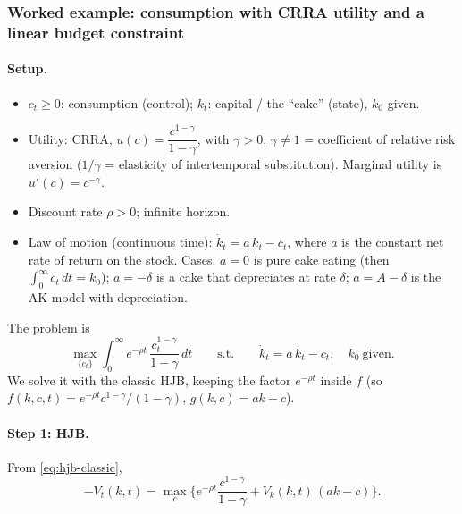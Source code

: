 \subsubsection{Worked example: consumption with CRRA utility and a linear budget constraint}

\paragraph{Setup.}
\begin{itemize}
\item $c_t\ge0$: consumption (control); $k_t$: capital / the ``cake'' (state), $k_0$ given.
\item Utility: CRRA, $u(c)=\dfrac{c^{1-\gamma}}{1-\gamma}$, with $\gamma>0$, $\gamma\ne1$ = coefficient of relative risk aversion ($1/\gamma$ = elasticity of intertemporal substitution). Marginal utility is $u'(c)=c^{-\gamma}$.
\item Discount rate $\rho>0$; infinite horizon.
\item Law of motion (continuous time): $\dot k_t=a\,k_t-c_t$, where $a$ is the constant net rate of return on the stock. Cases: $a=0$ is pure cake eating (then $\int_0^\infty c_t\,dt=k_0$); $a=-\delta$ is a cake that depreciates at rate $\delta$; $a=A-\delta$ is the AK model with depreciation.
\end{itemize}
The problem is
\begin{equation}\label{eq:cake-problem}
\max_{\{c_t\}}\int_0^\infty e^{-\rho t}\,\frac{c_t^{1-\gamma}}{1-\gamma}\,dt\qquad\text{s.t.}\qquad \dot k_t=a\,k_t-c_t,\quad k_0\ \text{given}.
\end{equation}
We solve it with the classic HJB, keeping the factor $e^{-\rho t}$ inside $f$ (so $f(k,c,t)=e^{-\rho t}c^{1-\gamma}/(1-\gamma)$, $g(k,c)=ak-c$).

\paragraph{Step 1: HJB.} From \eqref{eq:hjb-classic},
\begin{equation}\label{eq:cake-hjb}
-V_t(k,t)=\max_c\Big\{e^{-\rho t}\frac{c^{1-\gamma}}{1-\gamma}+V_k(k,t)\,(ak-c)\Big\}.
\end{equation}

